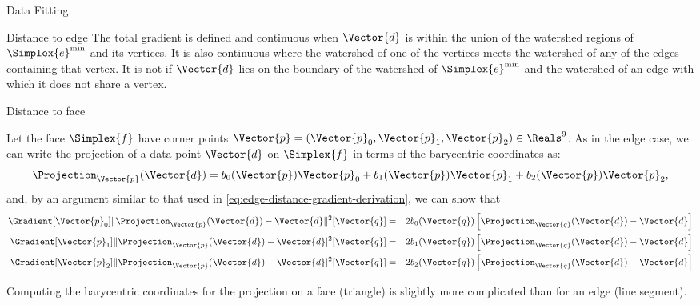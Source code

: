 \begin{plSection}{Data Fitting}
\begin{plSection}{Distance to edge}
The total gradient is defined and continuous
when $\Vector{d}$ is within the union of the watershed regions
of $\Simplex{e}^{\min}$ and its vertices.
It is also continuous where the watershed of one of the vertices
meets the watershed of any of the edges containing that vertex.
It is not if $\Vector{d}$ lies on the boundary of the
watershed of $\Simplex{e}^{\min}$ and the watershed of an
edge with which it does not share a vertex.

\end{plSection}%
\begin{plSection}{Distance to face}
\label{sec:Distance-to-face}

Let the face $\Simplex{f}$ have corner points 
$\Vector{p} = (\Vector{p}_0, \Vector{p}_1, \Vector{p}_2) \in \Reals^9$.
As in the edge case,
we can write the projection of a data point $\Vector{d}$ on $\Simplex{f}$
in terms of the barycentric coordinates as:
\begin{equation}
\Projection_\Vector{p} (\Vector{d}) = 
b_0(\Vector{p}) \Vector{p}_0 + b_1(\Vector{p}) \Vector{p}_1 
+ b_2(\Vector{p}) \Vector{p}_2,
\end{equation}
and, by an argument similar to that used in
\cref{eq:edge-distance-gradient-derivation},
we can show that
\begin{eqnarray}
\label{eq:face-distance-gradient}
\Gradient[\Vector{p}_0]
{\|\Projection_{\Vector{p}} (\Vector{d})-\Vector{d}\|^2 }
[\Vector{q}]
& = & 2 b_0(\Vector{q}) 
\left[ \Projection_{\Vector{q}} (\Vector{d})-\Vector{d} \right]
\\
\Gradient[\Vector{p}_1]
{\|\Projection_{\Vector{p}} (\Vector{d})-\Vector{d}|^2 }
[\Vector{q}]
& = & 2 b_1(\Vector{q}) 
\left[ \Projection_\Vector{q} (\Vector{d})-\Vector{d} \right]
\nonumber
\\
\Gradient[\Vector{p}_2]
{\|\Projection_{\Vector{p}} (\Vector{d})-\Vector{d}|^2 }
[\Vector{q}]
& = & 2 b_2(\Vector{q}) 
\left[ \Projection_\Vector{q} (\Vector{d})-\Vector{d} \right]
\nonumber
\end{eqnarray}

Computing the barycentric coordinates for the projection
on a face (triangle) is slightly more complicated than
for an edge (line segment).


\end{plSection}
\end{plSection}

